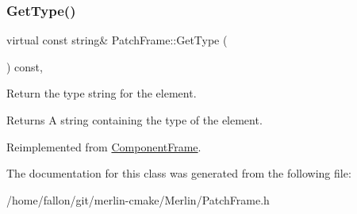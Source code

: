 \mbox{\label{classPatchFrame_a1ef493fda343de4400b198097db32f20}} 
\subsubsection{\texorpdfstring{Get\+Type()}{GetType()}}
{\footnotesize\ttfamily virtual const string\& Patch\+Frame\+::\+Get\+Type (\begin{DoxyParamCaption}{ }\end{DoxyParamCaption}) const\hspace{0.3cm}{\ttfamily [inline]}, {\ttfamily [virtual]}}

Return the type string for the element. \begin{DoxyReturn}{Returns}
A string containing the type of the element. 
\end{DoxyReturn}


Reimplemented from \hyperlink{classComponentFrame_ab87e0e461ced7eb26a6c58bd1b04cf05}{Component\+Frame}.



The documentation for this class was generated from the following file\+:\begin{DoxyCompactItemize}
\item 
/home/fallon/git/merlin-\/cmake/\+Merlin/Patch\+Frame.\+h\end{DoxyCompactItemize}
